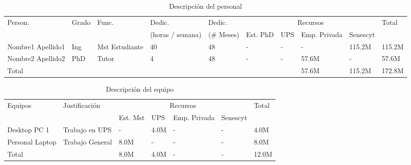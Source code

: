\documentclass[12pt,a4paper]{article}
\begin{document}
\begin{table}[ht!]
\caption{Descripción del personal}
\begin{tabular}{|p{1.1cm}|p{1.1cm}|p{1.1cm}|p{1.1cm}|p{1.3cm}|p{1.1cm}|p{1.1cm}|p{1.1cm}|p{1.1cm}|p{1.1cm}|} \hline
Person. & Grado & Func. & Dedic.  & Dedic.  & \multicolumn{4}{|c|}{Recursos} & Total \\ \cline{6-9}
  &   &   & (horas / semana)  &  (\# Meses) & Est. PhD  & UPS & Emp. Privada & Senescyt &  \\ \hline \hline
Nombre1 Apellido1  & Ing  & Mst Estudiante  & 40 & 48 & - & - & - & 115.2M & 115.2M \\ \hline
Nombre2 Apellido2  & PhD  & Tutor & 4 & 48 & - & - & 57.6M & - & 57.6M \\ \hline
Total &    &   &   &   &   &   & 57.6M &  115.2M & 172.8M \\ \hline
\end{tabular}
\end{table}

\begin{table}[ht!]
\caption{Descripción del equipo}
\begin{tabular}{|p{3.4cm}|p{3.4cm}|p{1.1cm}|p{1.1cm}|p{1.1cm}|p{1.1cm}|p{1.1cm}|} \hline
Equipos & Justificación & \multicolumn{4}{|c|}{Recursos} & Total \\ \cline{3-6}
 &   & Est. Mst & UPS & Emp. Privada & Senescyt &  \\ \hline \hline
Desktop PC 1 & Trabajo en UPS  & - & 4.0M & - & - & 4.0M \\ \hline
Personal Laptop & Trabajo General & 8.0M & - & - & - & 8.0M \\ \hline
Total &    & 8.0M & 4.0M & - & - & 12.0M \\ \hline
\end{tabular}
\end{table}
\end{document}
